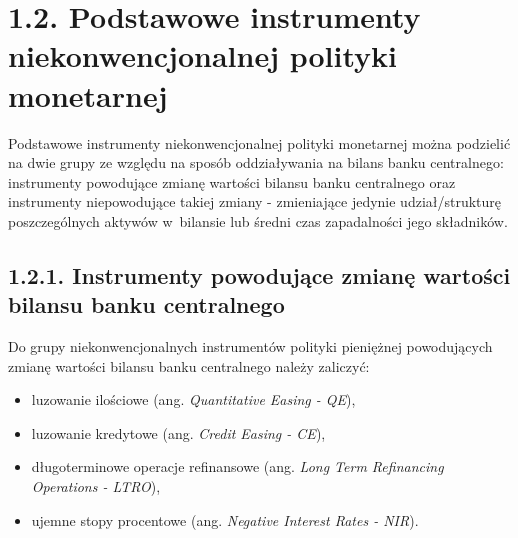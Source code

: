 \hypertarget{podroz11}{}
\section*{\large{1.2. Podstawowe instrumenty niekonwencjonalnej polityki monetarnej}}

Podstawowe instrumenty niekonwencjonalnej polityki monetarnej można podzielić na dwie grupy ze względu na sposób oddziaływania na bilans banku centralnego: instrumenty powodujące zmianę wartości bilansu banku centralnego oraz instrumenty niepowodujące takiej zmiany - zmieniające jedynie udział/strukturę poszczególnych aktywów w~bilansie lub średni czas zapadalności jego składników.

\hypertarget{podroz111}{}
\subsection*{\large{1.2.1. Instrumenty powodujące zmianę wartości bilansu banku centralnego}}

Do grupy niekonwencjonalnych instrumentów polityki pieniężnej powodujących zmianę wartości bilansu banku centralnego należy zaliczyć:

\begin{itemize}
\setlength\itemsep{0.05cm}
\item luzowanie ilościowe (ang. \textit{Quantitative Easing - QE}),
\item luzowanie kredytowe (ang. \textit{Credit Easing - CE}),
\item długoterminowe operacje refinansowe (ang. \textit{Long Term Refinancing Operations - LTRO}),
\item ujemne stopy procentowe (ang. \textit{Negative Interest Rates - NIR}).
\end{itemize}

